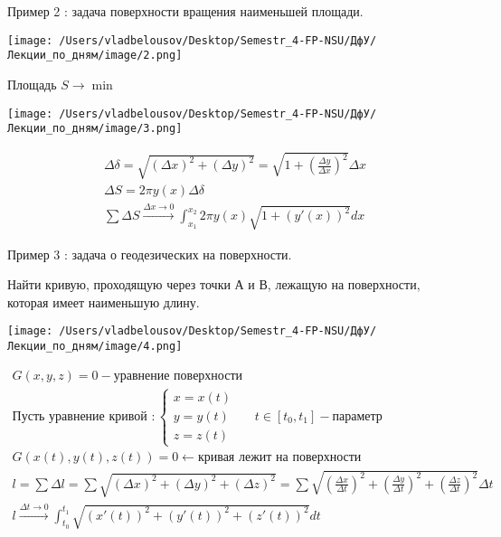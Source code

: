 \documentclass[12pt, a4paper]{report}
\begin{document}
\begin{flushleft}
    Пример 2 : задача поверхности вращения наименьшей площади. 
\end{flushleft}

\begin{center}
    \texttt{[image: /Users/vladbelousov/Desktop/Semestr\_4-FP-NSU/ДфУ/Лекции\_по\_дням/image/2.png]}
\end{center}

Площадь \( S \to \min  \) 

\begin{center}
    \texttt{[image: /Users/vladbelousov/Desktop/Semestr\_4-FP-NSU/ДфУ/Лекции\_по\_дням/image/3.png]}
\end{center}

\begin{gather*}
    \Delta \delta= \sqrt{(\Delta x ) ^2 + ( \Delta y) ^2} = \sqrt{1 + \left( \frac{\Delta y}{\Delta x}  \right) ^2} \Delta x \\
    \Delta S = 2 \pi y (x) \Delta \delta \\
    \sum  \Delta S \xrightarrow{\Delta x \to  0}  \int_{x_1}^{x_2} 2 \pi y(x ) \sqrt{1+(y'(x))^2}dx  
\end{gather*}


\begin{flushleft}
    Пример 3 : задача о геодезических на поверхности.
\end{flushleft}

Найти кривую, проходящую через точки А и В, лежащую на поверхности, которая имеет наименьшую длину.

\begin{center}
    \texttt{[image: /Users/vladbelousov/Desktop/Semestr\_4-FP-NSU/ДфУ/Лекции\_по\_дням/image/4.png]}
\end{center}
\begin{gather*}
    G(x,y,z)=0 - \text{уравнение поверхности} \\ 
    \text{Пусть уравнение кривой }:
    \begin{cases}
        x=x(t) \\
        y=y(t) \quad \quad t \in  [t_0,t_1] - \text{параметр} \\
        z= z(t)
    \end{cases}\\
    G(x(t),y(t),z(t)) = 0 \leftarrow \text{кривая лежит на поверхности}  \\
    l= \sum  \Delta l = \sum \sqrt{(\Delta x) ^2 + ( \Delta y ) ^2 + ( \Delta z ) ^2}=\sum  \sqrt{\left( \frac{\Delta x}{\Delta t} \right) ^2 + \left( \frac{\Delta y}{\Delta t} \right) ^2 + \left( \frac{\Delta z}{\Delta t} \right) ^2} \Delta t \\
    l \xrightarrow{\Delta t \to  0}    \int_{t_0}^{t_1} \sqrt{(x'(t)) ^2 + ( y'(t)) ^2 + ( z' ( t)) ^2 }dt  
\end{gather*}
\end{document}
